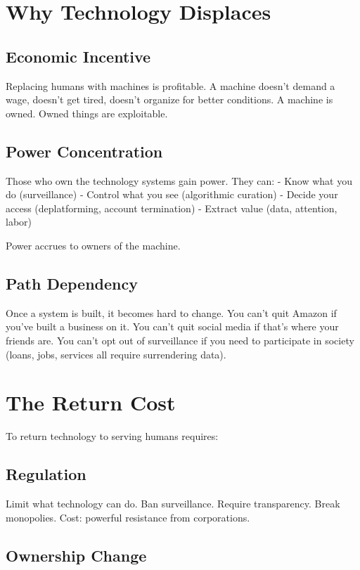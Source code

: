 \documentclass[12pt]{article}
\begin{document}
\section{Why Technology Displaces}

\subsection{Economic Incentive}

Replacing humans with machines is profitable. A machine doesn't demand a wage, doesn't get tired, doesn't organize for better conditions. A machine is owned. Owned things are exploitable.

\subsection{Power Concentration}

Those who own the technology systems gain power. They can:
- Know what you do (surveillance)
- Control what you see (algorithmic curation)
- Decide your access (deplatforming, account termination)
- Extract value (data, attention, labor)

Power accrues to owners of the machine.

\subsection{Path Dependency}

Once a system is built, it becomes hard to change. You can't quit Amazon if you've built a business on it. You can't quit social media if that's where your friends are. You can't opt out of surveillance if you need to participate in society (loans, jobs, services all require surrendering data).

\section{The Return Cost}

To return technology to serving humans requires:

\subsection{Regulation}

Limit what technology can do. Ban surveillance. Require transparency. Break monopolies. Cost: powerful resistance from corporations.

\subsection{Ownership Change}
\end{document}

